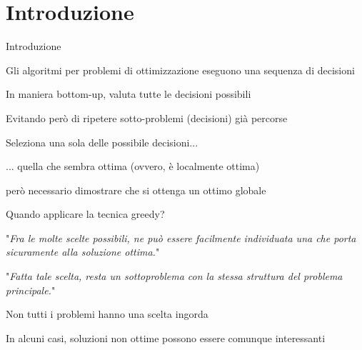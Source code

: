 \FrameContent



\section{Introduzione}

\begin{frame}{Introduzione}

\vspace{-9pt}
\begin{myboxtitle}
\BI
\item Gli algoritmi per problemi di ottimizzazione eseguono una sequenza di decisioni
\EI
\end{myboxtitle}

\begin{myboxtitle}
\BI
\item In maniera bottom-up, valuta tutte le decisioni possibili
\item Evitando però di ripetere sotto-problemi (decisioni) già percorse
\EI
\end{myboxtitle}

\begin{myboxtitle}
\BI
\item Seleziona una sola delle possibile decisioni...
\item ... quella che sembra ottima (ovvero, è localmente ottima)
\item \EE però necessario dimostrare che si ottenga un ottimo globale
\EI
\end{myboxtitle}
\end{frame}


\begin{frame}{Quando applicare la tecnica greedy?}

\vspace{-9pt}
\begin{myboxtitle}
"\emph{Fra le molte scelte possibili, ne può essere facilmente individuata una che porta sicuramente alla soluzione ottima.}"
\end{myboxtitle}

\begin{myboxtitle}
"\emph{Fatta tale scelta, resta un sottoproblema con la stessa struttura del problema principale.}"
\end{myboxtitle}

\begin{myboxtitle}[Note]
\BI
\item Non tutti i problemi hanno una scelta ingorda
\item In alcuni casi, soluzioni non ottime possono essere comunque interessanti
\EI
\end{myboxtitle}

\end{frame}

